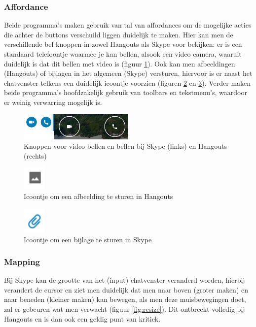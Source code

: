 \documentclass[11pt]{article}
\begin{document}
\subsubsection{Affordance}
Beide programma's maken gebruik van tal van affordances om de mogelijke acties die achter de buttons verschuild liggen duidelijk te maken. Hier kan men de verschillende bel knoppen in zowel Hangouts als Skype voor bekijken: er is een standaard telefoontje waarmee je kan bellen, alsook een video camera, waaruit duidelijk is dat dit bellen met video is (figuur
 \ref{fig:callicons}). Ook kan men afbeeldingen (Hangouts) of bijlagen in het algemeen (Skype) versturen, hiervoor is er naast het chatvenster telkens een duidelijk icoontje voorzien (figuren \ref{fig:afbeelding} en \ref{fig:bijlage}). Verder maken beide programma's hoofdzakelijk gebruik van toolbars en tekstmenu's, waardoor er weinig verwarring mogelijk is.
\begin{figure}
	\centering
	\includegraphics[width=0.5\textwidth]{Niels_icoontjes.png}
	\caption{Knoppen voor video bellen en bellen bij Skype (links) en Hangouts (rechts)}
	\label{fig:callicons}
\end{figure}
\begin{figure}
	\centering
	\includegraphics[width=0.1\textwidth]{Niels_afbeelding.png}
	\caption{Icoontje om een afbeelding te sturen in Hangouts}
	\label{fig:afbeelding}
\end{figure}
\begin{figure}
	\centering
	\includegraphics[width=0.1\textwidth]{Niels_bijlage.png}
	\caption{Icoontje om een bijlage te sturen in Skype}
	\label{fig:bijlage}
\end{figure}
\newpage
\subsubsection{Mapping}
Bij Skype kan de grootte van het (input) chatvenster veranderd worden, hierbij verandert de cursor en ziet men duidelijk dat men naar boven (groter maken) en naar beneden (kleiner maken) kan bewegen, als men deze muisbewegingen doet, zal er gebeuren wat men verwacht (figuur \ref{fig:resize}). Dit ontbreekt volledig bij Hangouts en is dan ook een geldig punt van kritiek.
\end{document}
